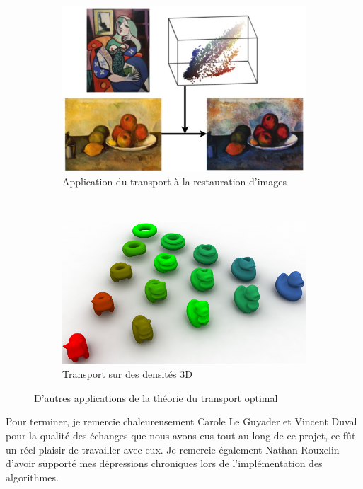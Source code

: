 \documentclass[a4paper,12pt]{article}
\begin{document}
\begin{figure}[!h]
\centering
\begin{subfigure}[b]{0.45\linewidth}
\includegraphics[width=\linewidth]{img/paint.png}
\caption*{Application du transport à la restauration d'images}
\end{subfigure}
~
\begin{subfigure}[b]{0.45\linewidth}
\includegraphics[width=\linewidth]{img/canard.png}
\caption*{Transport sur des densités 3D}
\end{subfigure}
\caption{D'autres applications de la théorie du transport optimal}
\end{figure}



Pour terminer, je remercie chaleureusement Carole Le Guyader et Vincent Duval pour la qualité des échanges que nous avons eus tout au long de ce projet, ce fût un réel plaisir de travailler avec eux. Je remercie également Nathan Rouxelin d'avoir supporté mes dépressions chroniques lors de l'implémentation des algorithmes. 
\end{document}
